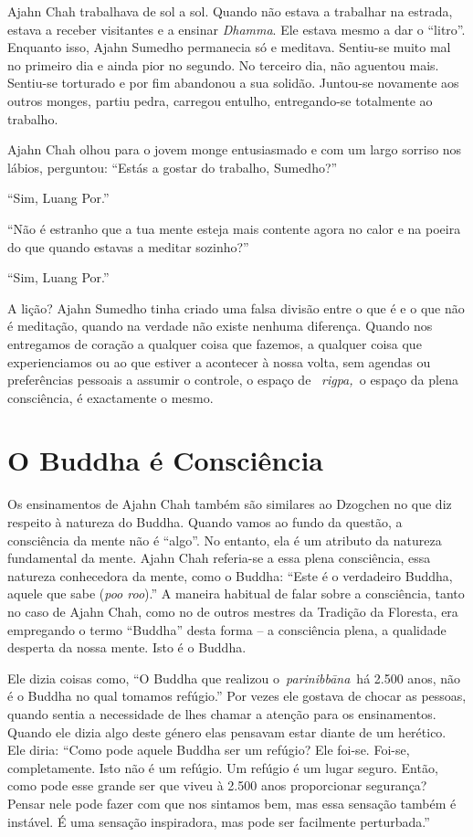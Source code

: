 Ajahn Chah trabalhava de sol a sol. Quando não estava a trabalhar na
estrada, estava a receber visitantes e a ensinar \emph{Dhamma}. Ele
estava mesmo a dar o ``litro''. Enquanto isso, Ajahn Sumedho permanecia
só e meditava. Sentiu-se muito mal no primeiro dia e ainda pior no
segundo. No terceiro dia, não aguentou mais. Sentiu-se torturado e por
fim abandonou a sua solidão. Juntou-se novamente aos outros monges,
partiu pedra, carregou entulho, entregando-se totalmente ao trabalho.~

Ajahn Chah olhou para o jovem monge entusiasmado e com um largo sorriso
nos lábios, perguntou: ``Estás a gostar do trabalho, Sumedho?''

``Sim, Luang Por.''

``Não é estranho que a tua mente esteja mais contente agora no calor e
na poeira do que quando estavas a meditar sozinho?''

``Sim, Luang Por.''

A lição? Ajahn Sumedho tinha criado uma falsa divisão entre o que é e o
que não é meditação, quando na verdade não existe nenhuma diferença.
Quando nos entregamos de coração a qualquer coisa que fazemos, a
qualquer coisa que experienciamos ou ao que estiver a acontecer à nossa
volta, sem agendas ou preferências pessoais a assumir o controle, o
espaço de ~\emph{rigpa,~}o espaço da plena consciência, é exactamente o
mesmo.

\section{O Buddha é Consciência}

Os ensinamentos de Ajahn Chah também são similares ao Dzogchen no que
diz respeito à natureza do Buddha. Quando vamos ao fundo da questão, a
consciência da mente não é ``algo''. No entanto, ela é um atributo da
natureza fundamental da mente. Ajahn Chah referia-se a essa plena
consciência, essa natureza conhecedora da mente, como o Buddha: ``Este é
o verdadeiro Buddha, aquele que sabe (\emph{poo roo}).'' A maneira
habitual de falar sobre a consciência, tanto no caso de Ajahn Chah, como
no de outros mestres da Tradição da Floresta, era empregando o termo
``Buddha'' desta forma -- a consciência plena, a qualidade desperta da
nossa mente. Isto é o Buddha.

Ele dizia coisas como, ``O Buddha que realizou o~\emph{parinibbāna}~há
2.500 anos, não é o Buddha no qual tomamos refúgio.'' Por vezes ele
gostava de chocar as pessoas, quando sentia a necessidade de lhes chamar
a atenção para os ensinamentos. Quando ele dizia algo deste género elas
pensavam estar diante de um herético. Ele diria: ``Como pode aquele
Buddha ser um refúgio? Ele foi-se. Foi-se, completamente. Isto não é um
refúgio. Um refúgio é um lugar seguro. Então, como pode esse grande ser
que viveu à 2.500 anos proporcionar segurança? Pensar nele pode fazer
com que nos sintamos bem, mas essa sensação também é instável. É uma
sensação inspiradora, mas pode ser facilmente perturbada.''

